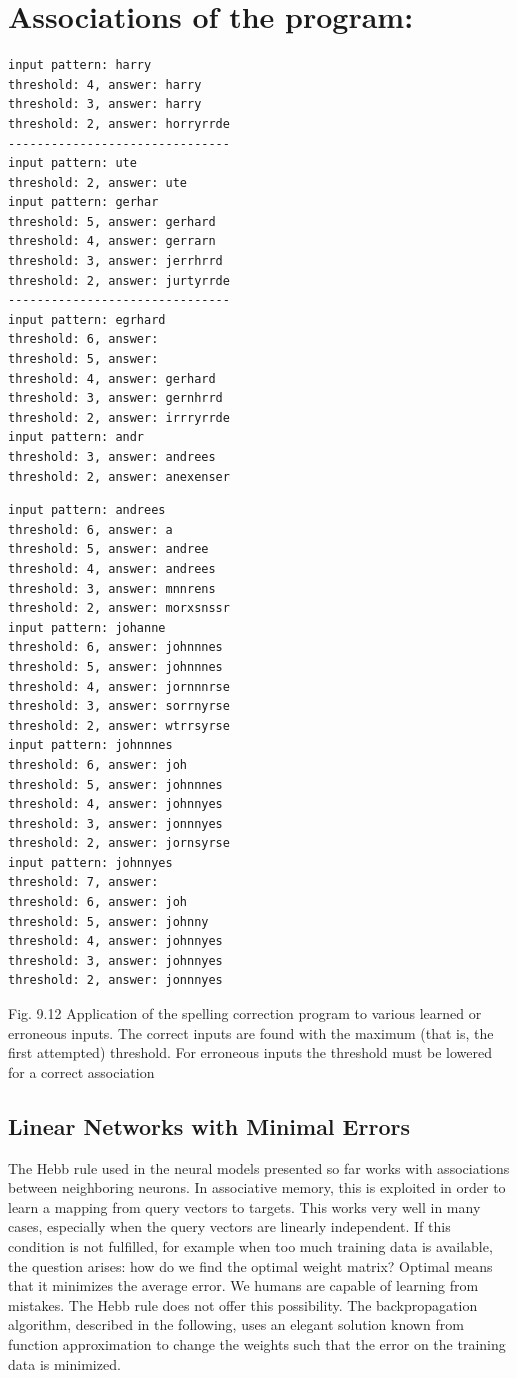 \documentclass[10pt]{book}
\begin{document}
\section{Associations of the program:}
\begin{verbatim}
input pattern: harry
threshold: 4, answer: harry
threshold: 3, answer: harry
threshold: 2, answer: horryrrde
-------------------------------
input pattern: ute
threshold: 2, answer: ute
input pattern: gerhar
threshold: 5, answer: gerhard
threshold: 4, answer: gerrarn
threshold: 3, answer: jerrhrrd
threshold: 2, answer: jurtyrrde
-------------------------------
input pattern: egrhard
threshold: 6, answer:
threshold: 5, answer:
threshold: 4, answer: gerhard
threshold: 3, answer: gernhrrd
threshold: 2, answer: irrryrrde
input pattern: andr
threshold: 3, answer: andrees
threshold: 2, answer: anexenser
\end{verbatim}

\begin{verbatim}
input pattern: andrees
threshold: 6, answer: a
threshold: 5, answer: andree
threshold: 4, answer: andrees
threshold: 3, answer: mnnrens
threshold: 2, answer: morxsnssr
input pattern: johanne
threshold: 6, answer: johnnnes
threshold: 5, answer: johnnnes
threshold: 4, answer: jornnnrse
threshold: 3, answer: sorrnyrse
threshold: 2, answer: wtrrsyrse
input pattern: johnnnes
threshold: 6, answer: joh
threshold: 5, answer: johnnnes
threshold: 4, answer: johnnyes
threshold: 3, answer: jonnnyes
threshold: 2, answer: jornsyrse
input pattern: johnnyes
threshold: 7, answer:
threshold: 6, answer: joh
threshold: 5, answer: johnny
threshold: 4, answer: johnnyes
threshold: 3, answer: johnnyes
threshold: 2, answer: jonnnyes
\end{verbatim}

Fig. 9.12 Application of the spelling correction program to various learned or erroneous inputs. The correct inputs are found with the maximum (that is, the first attempted) threshold. For erroneous inputs the threshold must be lowered for a correct association

\subsection{Linear Networks with Minimal Errors}
The Hebb rule used in the neural models presented so far works with associations between neighboring neurons. In associative memory, this is exploited in order to learn a mapping from query vectors to targets. This works very well in many cases, especially when the query vectors are linearly independent. If this condition is not fulfilled, for example when too much training data is available, the question arises: how do we find the optimal weight matrix? Optimal means that it minimizes the average error.
We humans are capable of learning from mistakes. The Hebb rule does not offer this possibility. The backpropagation algorithm, described in the following, uses an elegant solution known from function approximation to change the weights such that the error on the training data is minimized.
\end{document}

